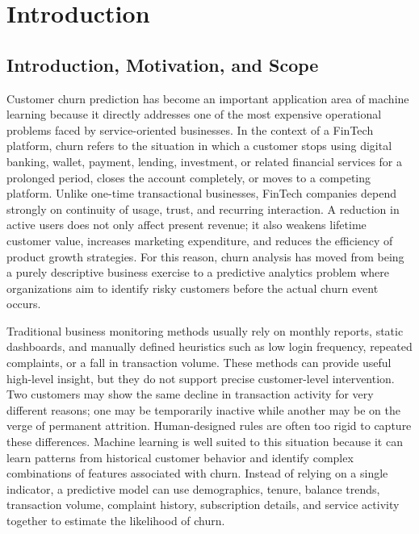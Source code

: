 \chapter{Introduction}

\section{Introduction, Motivation, and Scope}
Customer churn prediction has become an important application area of machine learning because it directly addresses one of the most expensive operational problems faced by service-oriented businesses. In the context of a FinTech platform, churn refers to the situation in which a customer stops using digital banking, wallet, payment, lending, investment, or related financial services for a prolonged period, closes the account completely, or moves to a competing platform. Unlike one-time transactional businesses, FinTech companies depend strongly on continuity of usage, trust, and recurring interaction. A reduction in active users does not only affect present revenue; it also weakens lifetime customer value, increases marketing expenditure, and reduces the efficiency of product growth strategies. For this reason, churn analysis has moved from being a purely descriptive business exercise to a predictive analytics problem where organizations aim to identify risky customers before the actual churn event occurs.

Traditional business monitoring methods usually rely on monthly reports, static dashboards, and manually defined heuristics such as low login frequency, repeated complaints, or a fall in transaction volume. These methods can provide useful high-level insight, but they do not support precise customer-level intervention. Two customers may show the same decline in transaction activity for very different reasons; one may be temporarily inactive while another may be on the verge of permanent attrition. Human-designed rules are often too rigid to capture these differences. Machine learning is well suited to this situation because it can learn patterns from historical customer behavior and identify complex combinations of features associated with churn. Instead of relying on a single indicator, a predictive model can use demographics, tenure, balance trends, transaction volume, complaint history, subscription details, and service activity together to estimate the likelihood of churn.

